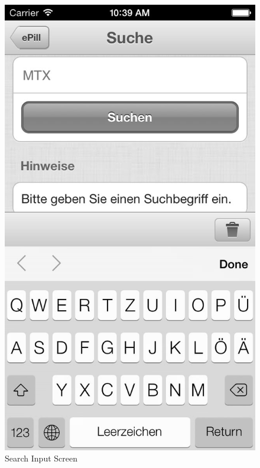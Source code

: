 \begin{figure}[ptbh]
\begin{minipage}[b]{0.45\linewidth}
        \includegraphics[width=0.8025\linewidth]{figures/Search_bw.jpg}
        \caption[Search Input Screen]{Search Input Screen}
        \label{fig:SearchInputScreen}
    \end{minipage}
    \hspace{0.5cm}
    \begin{minipage}[b]{0.45\linewidth}
        \centering

\end{minipage}
\end{figure}
